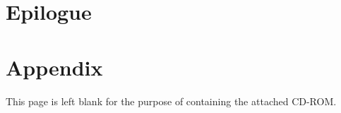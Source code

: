 \part{Epilogue}
\clearpage{\thispagestyle{empty}\cleardoublepage}

\clearpage{\thispagestyle{empty}\cleardoublepage}

\clearpage{\thispagestyle{empty}\cleardoublepage}


\clearpage{\thispagestyle{empty}\cleardoublepage}

\part{Appendix}
\clearpage{\thispagestyle{empty}\cleardoublepage}




\label{bib}
\clearpage{\thispagestyle{empty}\cleardoublepage}

\thispagestyle{empty}
\vspace*{4cm}
\label{cd}
{\centering This page is left blank for the purpose of containing the attached CD-ROM.}

